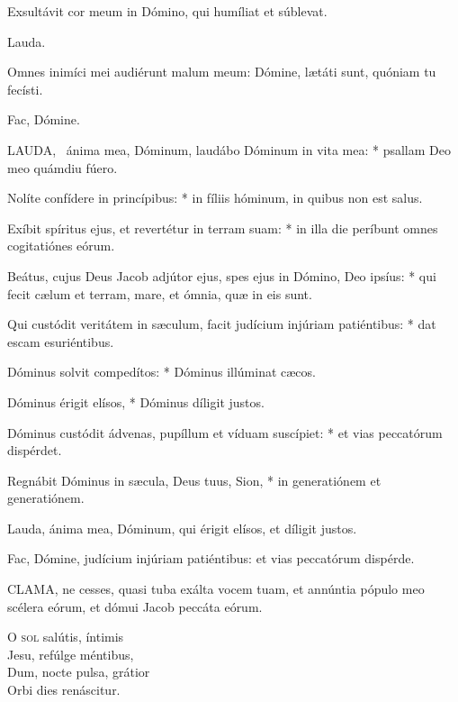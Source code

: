  Exsultávit cor meum in Dómino, qui humíliat et súblevat.

 Lauda. \textdagger


 Omnes inimíci mei audiérunt malum meum: Dómine, lætáti sunt, quóniam tu fecísti.

 Fac, Dómine.


\lettrine[lines=2]{L}{AUDA}, \textdagger\ ánima mea, Dóminum, laudábo Dóminum in vita mea: * psallam Deo meo quámdiu fúero.

Nolíte confídere in princípibus: * in fíliis hóminum, in quibus non est salus.

Exíbit spíritus ejus, et revertétur in terram suam: * in illa die períbunt omnes cogitatiónes eórum.

Beátus, cujus Deus Jacob adjútor ejus, spes ejus in Dómino, Deo ipsíus: * qui fecit cælum et terram, mare, et ómnia, quæ in eis sunt.

Qui custódit veritátem in sæculum, facit judícium injúriam patiéntibus: * dat escam esuriéntibus.

Dóminus solvit compedítos: * Dóminus illúminat cæcos.

Dóminus érigit elísos, * Dóminus díligit justos.

Dóminus custódit ádvenas, pupíllum et víduam suscípiet: * et vias peccatórum dispérdet.

Regnábit Dóminus in sæcula, Deus tuus, Sion, * in generatiónem et generatiónem.

 Lauda, ánima mea, Dóminum, qui érigit elísos, et díligit justos.


 Fac, Dómine, judícium injúriam patiéntibus: et vias peccatórum dispérde.



\lettrine[lines=2]{C}{LAMA}, ne cesses, quasi tuba exálta vocem tuam, et annúntia pópulo meo scélera eórum, et dómui Jacob peccáta eórum.


\lettrine[lines=2]{O}{} \textsc{sol} salútis, íntimis\\
Jesu, refúlge méntibus,\\
Dum, nocte pulsa, grátior\\
Orbi dies renáscitur.

